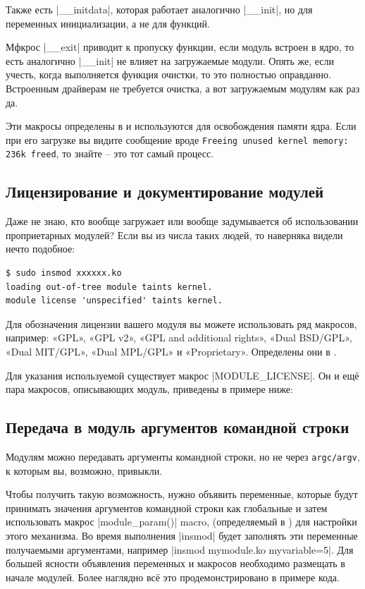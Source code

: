 \documentclass[10pt, oneside]{book}
\begin{document}
Также есть \cpp|__initdata|, которая работает аналогично \cpp|__init|, но для переменных инициализации, а не для функций.

Мфкрос \cpp|__exit| приводит к пропуску функции, если модуль встроен в ядро, то есть аналогично \cpp|__init| не влияет на загружаемые модули.
Опять же, если учесть, когда выполняется функция очистки, то это полностью оправданно. Встроенным драйверам не требуется очистка, а вот загружаемым модулям как раз да.

Эти макросы определены в  и используются для освобождения памяти ядра.
Если при его загрузке вы видите сообщение вроде \verb|Freeing unused kernel memory: 236k freed|, то знайте – это тот самый процесс.


\subsection{Лицензирование и документирование модулей}
\label{modlicense}
Даже не знаю, кто вообще загружает или вообще задумывается об использовании проприетарных модулей? Если вы из числа таких людей, то наверняка видели нечто подобное:
\begin{verbatim}
$ sudo insmod xxxxxx.ko
loading out-of-tree module taints kernel.
module license 'unspecified' taints kernel.
\end{verbatim}

Для обозначения лицензии вашего модуля вы можете использовать ряд макросов,
например: «GPL», «GPL v2», «GPL and additional rights», «Dual BSD/GPL», «Dual
MIT/GPL», «Dual MPL/GPL» и «Proprietary». Определены они в .

Для указания используемой существует макрос \cpp|MODULE_LICENSE|.
Он и ещё пара макросов, описывающих модуль, приведены в примере ниже:


\subsection{Передача в модуль аргументов командной строки}
\label{modparam}
Модулям можно передавать аргументы командной строки, но не через \verb|argc/argv|, к которым вы, возможно, привыкли.

Чтобы получить такую возможность, нужно объявить переменные, которые будут принимать значения аргументов командной строки как глобальные и затем использовать макрос \cpp|module_param()| macro, (определяемый в ) для настройки этого механизма. Во время выполнения \sh|insmod| будет заполнять эти переменные получаемыми аргументами, например \sh|insmod mymodule.ko myvariable=5|.
Для большей ясности объявления переменных и макросов необходимо размещать в начале модулей. Более наглядно всё это продемонстрировано в примере кода.
\end{document}
